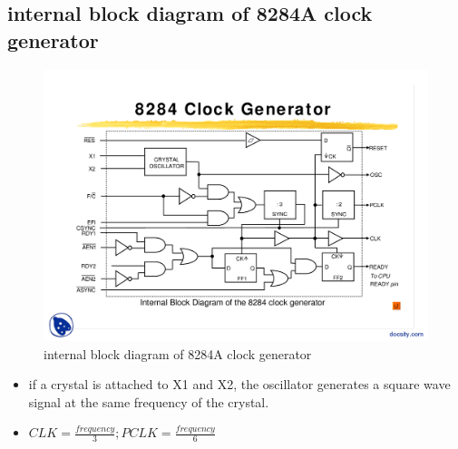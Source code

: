\documentclass[12pt]{article}
\begin{document}
\subsection{internal block diagram of 8284A clock generator}
\begin{figure}[H]
	\centering
	\captionsetup{justification=centering}
	\includegraphics[width = 1.0\textwidth]{image/8284AINT.png}
	\caption{
		internal block diagram of 8284A clock generator
	}
	
\end{figure}

\begin{itemize}
	\item if a crystal is attached to X1 and X2, the oscillator generates a square wave signal at the same frequency of the crystal.\\
	\item $CLK=\frac{frequency}{3}; PCLK=\frac{frequency}{6}$\\
\end{itemize}
\end{document}
